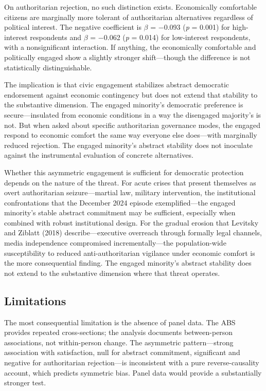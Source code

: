 \documentclass[
  12pt,
  12pt,
  letterpaper]{article}
\begin{document}
On authoritarian rejection, no such distinction exists. Economically
comfortable citizens are marginally more tolerant of authoritarian
alternatives regardless of political interest. The negative coefficient
is \(\beta\) = −0.093 (\emph{p} = 0.001) for high-interest respondents
and \(\beta\) = −0.062 (\emph{p} = 0.014) for low-interest respondents,
with a nonsignificant interaction. If anything, the economically
comfortable and politically engaged show a slightly stronger
shift---though the difference is not statistically distinguishable.

The implication is that civic engagement stabilizes abstract democratic
endorsement against economic contingency but does not extend that
stability to the substantive dimension. The engaged minority's
democratic preference is secure---insulated from economic conditions in
a way the disengaged majority's is not. But when asked about specific
authoritarian governance modes, the engaged respond to economic comfort
the same way everyone else does---with marginally reduced rejection. The
engaged minority's abstract stability does not inoculate against the
instrumental evaluation of concrete alternatives.

Whether this asymmetric engagement is sufficient for democratic
protection depends on the nature of the threat. For acute crises that
present themselves as overt authoritarian seizure---martial law,
military intervention, the institutional confrontations that the
December 2024 episode exemplified---the engaged minority's stable
abstract commitment may be sufficient, especially when combined with
robust institutional design. For the gradual erosion that Levitsky and
Ziblatt (2018) describe---executive overreach through formally legal
channels, media independence compromised incrementally---the
population-wide susceptibility to reduced anti-authoritarian vigilance
under economic comfort is the more consequential finding. The engaged
minority's abstract stability does not extend to the substantive
dimension where that threat operates.

\subsection{Limitations}\label{limitations}

The most consequential limitation is the absence of panel data. The ABS
provides repeated cross-sections; the analysis documents between-person
associations, not within-person change. The asymmetric pattern---strong
association with satisfaction, null for abstract commitment, significant
and negative for authoritarian rejection---is inconsistent with a pure
reverse-causality account, which predicts symmetric bias. Panel data
would provide a substantially stronger test.
\end{document}
